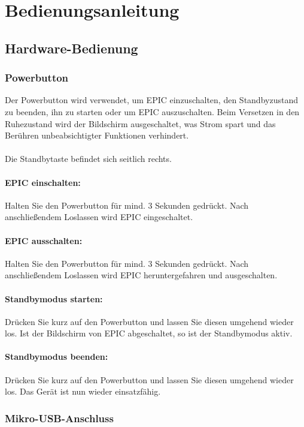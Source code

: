 \section{Bedienungsanleitung}
\subsection{Hardware-Bedienung}

\subsubsection{Powerbutton}

Der Powerbutton wird verwendet, um EPIC einzuschalten, den Standbyzustand zu beenden, ihn zu starten oder um EPIC auszuschalten. Beim Versetzen in den Ruhezustand wird der Bildschirm ausgeschaltet, was Strom spart und das Berühren unbeabsichtigter Funktionen verhindert.\\
\\
Die Standbytaste befindet sich seitlich rechts.


\paragraph{EPIC einschalten:}
Halten Sie den Powerbutton für mind. 3 Sekunden gedrückt. Nach anschließendem Loslassen wird EPIC eingeschaltet.

\paragraph{EPIC ausschalten:}
Halten Sie den Powerbutton für mind. 3 Sekunden gedrückt. Nach anschließendem Loslassen wird EPIC heruntergefahren und ausgeschalten.

\paragraph{Standbymodus starten:}
Drücken Sie kurz auf den Powerbutton und lassen Sie diesen umgehend wieder los. Ist der Bildschirm von EPIC abgeschaltet, so ist der Standbymodus aktiv.

\paragraph{Standbymodus beenden:}
Drücken Sie kurz auf den Powerbutton und lassen Sie diesen umgehend wieder los. Das Gerät ist nun wieder einsatzfähig.

\subsubsection{Mikro-USB-Anschluss}

